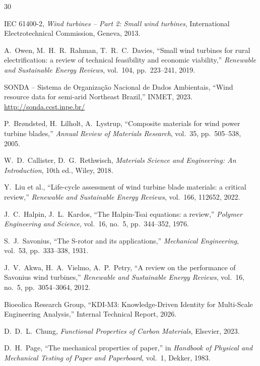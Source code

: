 \documentclass[twocolumn]{article}
\begin{document}
\begin{thebibliography}{30}

IEC 61400-2, \textit{Wind turbines -- Part 2: Small wind turbines}, International Electrotechnical Commission, Geneva, 2013.

A.~Owen, M.~H.~R.~Rahman, T.~R.~C.~Davies, ``Small wind turbines for rural electrification: a review of technical feasibility and economic viability,'' \textit{Renewable and Sustainable Energy Reviews}, vol.~104, pp.~223--241, 2019.

SONDA -- Sistema de Organiza\c{c}\~ao Nacional de Dados Ambientais, ``Wind resource data for semi-arid Northeast Brazil,'' INMET, 2023. \url{http://sonda.ccst.inpe.br/}

P.~Br{\o}ndsted, H.~Lilholt, A.~Lystrup, ``Composite materials for wind power turbine blades,'' \textit{Annual Review of Materials Research}, vol.~35, pp.~505--538, 2005.

W.~D.~Callister, D.~G.~Rethwisch, \textit{Materials Science and Engineering: An Introduction}, 10th ed., Wiley, 2018.

Y.~Liu et al., ``Life-cycle assessment of wind turbine blade materials: a critical review,'' \textit{Renewable and Sustainable Energy Reviews}, vol.~166, 112652, 2022.

J.~C.~Halpin, J.~L.~Kardos, ``The Halpin-Tsai equations: a review,'' \textit{Polymer Engineering and Science}, vol.~16, no.~5, pp.~344--352, 1976.

S.~J.~Savonius, ``The S-rotor and its applications,'' \textit{Mechanical Engineering}, vol.~53, pp.~333--338, 1931.

J.~V.~Akwa, H.~A.~Vielmo, A.~P.~Petry, ``A review on the performance of Savonius wind turbines,'' \textit{Renewable and Sustainable Energy Reviews}, vol.~16, no.~5, pp.~3054--3064, 2012.

Bioeolica Research Group, ``KDI-M3: Knowledge-Driven Identity for Multi-Scale Engineering Analysis,'' Internal Technical Report, 2026.

D.~D.~L.~Chung, \textit{Functional Properties of Carbon Materials}, Elsevier, 2023.

D.~H.~Page, ``The mechanical properties of paper,'' in \textit{Handbook of Physical and Mechanical Testing of Paper and Paperboard}, vol.~1, Dekker, 1983.


\end{thebibliography}
\end{document}
